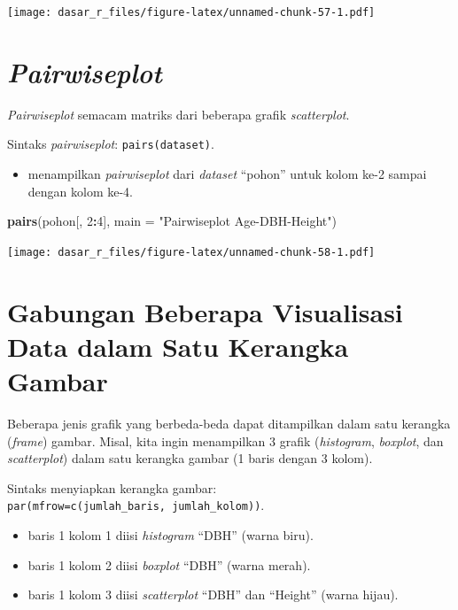 \documentclass[
  12pt,
  a4paper,
]{scrbook}
\newenvironment{Shaded}{\begin{snugshade}}{\end{snugshade}}
\newcommand{\DataTypeTok}[1]{\textcolor[rgb]{0.13,0.29,0.53}{#1}}
\newcommand{\DecValTok}[1]{\textcolor[rgb]{0.00,0.00,0.81}{#1}}
\newcommand{\KeywordTok}[1]{\textcolor[rgb]{0.13,0.29,0.53}{\textbf{#1}}}
\newcommand{\NormalTok}[1]{#1}
\newcommand{\OperatorTok}[1]{\textcolor[rgb]{0.81,0.36,0.00}{\textbf{#1}}}
\newcommand{\StringTok}[1]{\textcolor[rgb]{0.31,0.60,0.02}{#1}}
\providecommand{\tightlist}{%
  \setlength{\itemsep}{0pt}\setlength{\parskip}{0pt}}
\begin{document}
\texttt{[image: dasar\_r\_files/figure-latex/unnamed-chunk-57-1.pdf]}

\newpage

\hypertarget{pairwiseplot}{%
\section{\texorpdfstring{\emph{Pairwiseplot}}{Pairwiseplot}}\label{pairwiseplot}}

\emph{Pairwiseplot} semacam matriks dari beberapa grafik
\emph{scatterplot}.

Sintaks \emph{pairwiseplot}: \texttt{pairs(dataset)}.

\begin{itemize}
\tightlist
\item
  menampilkan \emph{pairwiseplot} dari \emph{dataset} ``pohon'' untuk
  kolom ke-2 sampai dengan kolom ke-4.
\end{itemize}

\begin{Shaded}
\begin{Highlighting}[]
\KeywordTok{pairs}\NormalTok{(pohon[, }\DecValTok{2}\OperatorTok{:}\DecValTok{4}\NormalTok{], }\DataTypeTok{main =} \StringTok{"Pairwiseplot Age-DBH-Height"}\NormalTok{)}
\end{Highlighting}
\end{Shaded}

\texttt{[image: dasar\_r\_files/figure-latex/unnamed-chunk-58-1.pdf]}

\hypertarget{gabungan-beberapa-visualisasi-data-dalam-satu-kerangka-gambar}{%
\section{Gabungan Beberapa Visualisasi Data dalam Satu Kerangka
Gambar}\label{gabungan-beberapa-visualisasi-data-dalam-satu-kerangka-gambar}}

Beberapa jenis grafik yang berbeda-beda dapat ditampilkan dalam satu
kerangka (\emph{frame}) gambar. Misal, kita ingin menampilkan 3 grafik
(\emph{histogram}, \emph{boxplot}, dan \emph{scatterplot}) dalam satu
kerangka gambar (1 baris dengan 3 kolom).

Sintaks menyiapkan kerangka gambar:
\texttt{par(mfrow=c(jumlah\_baris,\ jumlah\_kolom))}.

\newpage

\begin{itemize}
\tightlist
\item
  baris 1 kolom 1 diisi \emph{histogram} ``DBH'' (warna biru).
\item
  baris 1 kolom 2 diisi \emph{boxplot} ``DBH'' (warna merah).
\item
  baris 1 kolom 3 diisi \emph{scatterplot} ``DBH'' dan ``Height'' (warna
  hijau).
\end{itemize}
\end{document}
